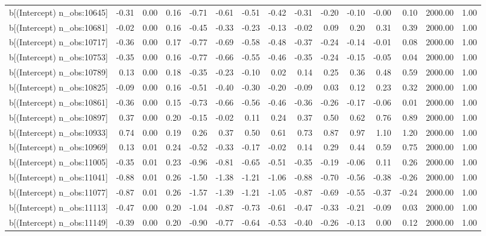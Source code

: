 \begin{table}[ht]
\begin{tabular}{rrrrrrrrrrrrrrr}
  b[(Intercept) n\_obs:10645] & -0.31 & 0.00 & 0.16 & -0.71 & -0.61 & -0.51 & -0.42 & -0.31 & -0.20 & -0.10 & -0.00 & 0.10 & 2000.00 & 1.00 \\ 
  b[(Intercept) n\_obs:10681] & -0.02 & 0.00 & 0.16 & -0.45 & -0.33 & -0.23 & -0.13 & -0.02 & 0.09 & 0.20 & 0.31 & 0.39 & 2000.00 & 1.00 \\ 
  b[(Intercept) n\_obs:10717] & -0.36 & 0.00 & 0.17 & -0.77 & -0.69 & -0.58 & -0.48 & -0.37 & -0.24 & -0.14 & -0.01 & 0.08 & 2000.00 & 1.00 \\ 
  b[(Intercept) n\_obs:10753] & -0.35 & 0.00 & 0.16 & -0.77 & -0.66 & -0.55 & -0.46 & -0.35 & -0.24 & -0.15 & -0.05 & 0.04 & 2000.00 & 1.00 \\ 
  b[(Intercept) n\_obs:10789] & 0.13 & 0.00 & 0.18 & -0.35 & -0.23 & -0.10 & 0.02 & 0.14 & 0.25 & 0.36 & 0.48 & 0.59 & 2000.00 & 1.00 \\ 
  b[(Intercept) n\_obs:10825] & -0.09 & 0.00 & 0.16 & -0.51 & -0.40 & -0.30 & -0.20 & -0.09 & 0.03 & 0.12 & 0.23 & 0.32 & 2000.00 & 1.00 \\ 
  b[(Intercept) n\_obs:10861] & -0.36 & 0.00 & 0.15 & -0.73 & -0.66 & -0.56 & -0.46 & -0.36 & -0.26 & -0.17 & -0.06 & 0.01 & 2000.00 & 1.00 \\ 
  b[(Intercept) n\_obs:10897] & 0.37 & 0.00 & 0.20 & -0.15 & -0.02 & 0.11 & 0.24 & 0.37 & 0.50 & 0.62 & 0.76 & 0.89 & 2000.00 & 1.00 \\ 
  b[(Intercept) n\_obs:10933] & 0.74 & 0.00 & 0.19 & 0.26 & 0.37 & 0.50 & 0.61 & 0.73 & 0.87 & 0.97 & 1.10 & 1.20 & 2000.00 & 1.00 \\ 
  b[(Intercept) n\_obs:10969] & 0.13 & 0.01 & 0.24 & -0.52 & -0.33 & -0.17 & -0.02 & 0.14 & 0.29 & 0.44 & 0.59 & 0.75 & 2000.00 & 1.00 \\ 
  b[(Intercept) n\_obs:11005] & -0.35 & 0.01 & 0.23 & -0.96 & -0.81 & -0.65 & -0.51 & -0.35 & -0.19 & -0.06 & 0.11 & 0.26 & 2000.00 & 1.00 \\ 
  b[(Intercept) n\_obs:11041] & -0.88 & 0.01 & 0.26 & -1.50 & -1.38 & -1.21 & -1.06 & -0.88 & -0.70 & -0.56 & -0.38 & -0.26 & 2000.00 & 1.00 \\ 
  b[(Intercept) n\_obs:11077] & -0.87 & 0.01 & 0.26 & -1.57 & -1.39 & -1.21 & -1.05 & -0.87 & -0.69 & -0.55 & -0.37 & -0.24 & 2000.00 & 1.00 \\ 
  b[(Intercept) n\_obs:11113] & -0.47 & 0.00 & 0.20 & -1.04 & -0.87 & -0.73 & -0.61 & -0.47 & -0.33 & -0.21 & -0.09 & 0.03 & 2000.00 & 1.00 \\ 
  b[(Intercept) n\_obs:11149] & -0.39 & 0.00 & 0.20 & -0.90 & -0.77 & -0.64 & -0.53 & -0.40 & -0.26 & -0.13 & 0.00 & 0.12 & 2000.00 & 1.00 \\ 

\end{tabular}
\end{table}
